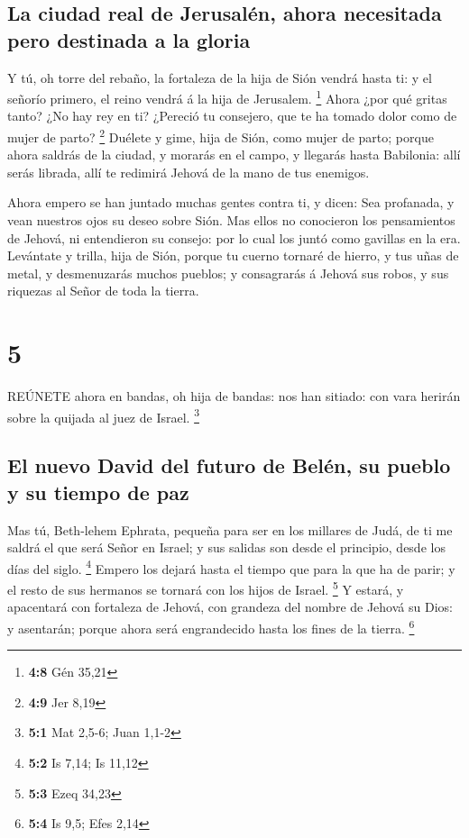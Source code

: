 \hypertarget{la-ciudad-real-de-jerusaluxe9n-ahora-necesitada-pero-destinada-a-la-gloria}{%
\subsection{La ciudad real de Jerusalén, ahora necesitada pero destinada
a la
gloria}\label{la-ciudad-real-de-jerusaluxe9n-ahora-necesitada-pero-destinada-a-la-gloria}}

 Y tú, oh torre del rebaño, la fortaleza de la hija de Sión
vendrá hasta ti: y el señorío primero, el reino vendrá á la hija de
Jerusalem. \footnote{\textbf{4:8} Gén 35,21}  Ahora ¿por qué
gritas tanto? ¿No hay rey en ti? ¿Pereció tu consejero, que te ha tomado
dolor como de mujer de parto? \footnote{\textbf{4:9} Jer 8,19}
 Duélete y gime, hija de Sión, como mujer de parto; porque
ahora saldrás de la ciudad, y morarás en el campo, y llegarás hasta
Babilonia: allí serás librada, allí te redimirá Jehová de la mano de tus
enemigos.

 Ahora empero se han juntado muchas gentes contra ti, y
dicen: Sea profanada, y vean nuestros ojos su deseo sobre Sión.
 Mas ellos no conocieron los pensamientos de Jehová, ni
entendieron su consejo: por lo cual los juntó como gavillas en la era.
 Levántate y trilla, hija de Sión, porque tu cuerno tornaré
de hierro, y tus uñas de metal, y desmenuzarás muchos pueblos; y
consagrarás á Jehová sus robos, y sus riquezas al Señor de toda la
tierra.

\hypertarget{section-4}{%
\section{5}\label{section-4}}

 REÚNETE ahora en bandas, oh hija de bandas: nos han
sitiado: con vara herirán sobre la quijada al juez de Israel.
\footnote{\textbf{5:1} Mat 2,5-6; Juan 1,1-2}

\hypertarget{el-nuevo-david-del-futuro-de-beluxe9n-su-pueblo-y-su-tiempo-de-paz}{%
\subsection{El nuevo David del futuro de Belén, su pueblo y su tiempo de
paz}\label{el-nuevo-david-del-futuro-de-beluxe9n-su-pueblo-y-su-tiempo-de-paz}}

 Mas tú, Beth-lehem Ephrata, pequeña para ser en los
millares de Judá, de ti me saldrá el que será Señor en Israel; y sus
salidas son desde el principio, desde los días del siglo. \footnote{\textbf{5:2}
  Is 7,14; Is 11,12}  Empero los dejará hasta el tiempo que
para la que ha de parir; y el resto de sus hermanos se tornará con los
hijos de Israel. \footnote{\textbf{5:3} Ezeq 34,23}  Y
estará, y apacentará con fortaleza de Jehová, con grandeza del nombre de
Jehová su Dios: y asentarán; porque ahora será engrandecido hasta los
fines de la tierra. \footnote{\textbf{5:4} Is 9,5; Efes 2,14}

